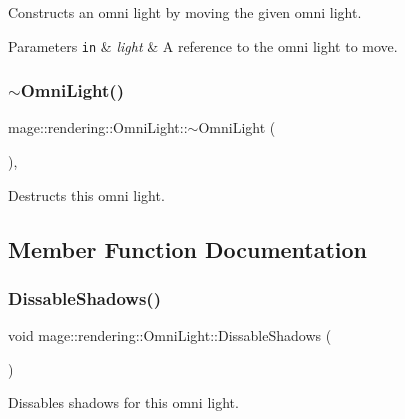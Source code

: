 Constructs an omni light by moving the given omni light.


\begin{DoxyParams}[1]{Parameters}
\mbox{\tt in}  & {\em light} & A reference to the omni light to move. \\
\hline
\end{DoxyParams}
\hypertarget{classmage_1_1rendering_1_1_omni_light_af0981e056620d3f0df827098448c8052}{}\label{classmage_1_1rendering_1_1_omni_light_af0981e056620d3f0df827098448c8052} 
\subsubsection{\texorpdfstring{$\sim$\+Omni\+Light()}{~OmniLight()}}
{\footnotesize\ttfamily mage\+::rendering\+::\+Omni\+Light\+::$\sim$\+Omni\+Light (\begin{DoxyParamCaption}{ }\end{DoxyParamCaption})\hspace{0.3cm}{\ttfamily [virtual]}, {\ttfamily [default]}}

Destructs this omni light. 

\subsection{Member Function Documentation}
\hypertarget{classmage_1_1rendering_1_1_omni_light_a18eaf3b2683997854827b12ec26c9039}{}\label{classmage_1_1rendering_1_1_omni_light_a18eaf3b2683997854827b12ec26c9039} 
\subsubsection{\texorpdfstring{Dissable\+Shadows()}{DissableShadows()}}
{\footnotesize\ttfamily void mage\+::rendering\+::\+Omni\+Light\+::\+Dissable\+Shadows (\begin{DoxyParamCaption}{ }\end{DoxyParamCaption})\hspace{0.3cm}{\ttfamily [noexcept]}}

Dissables shadows for this omni light. \hypertarget{classmage_1_1rendering_1_1_omni_light_a676a457b4e79b7dc74696acc713a9230}{}\label{classmage_1_1rendering_1_1_omni_light_a676a457b4e79b7dc74696acc713a9230} 
